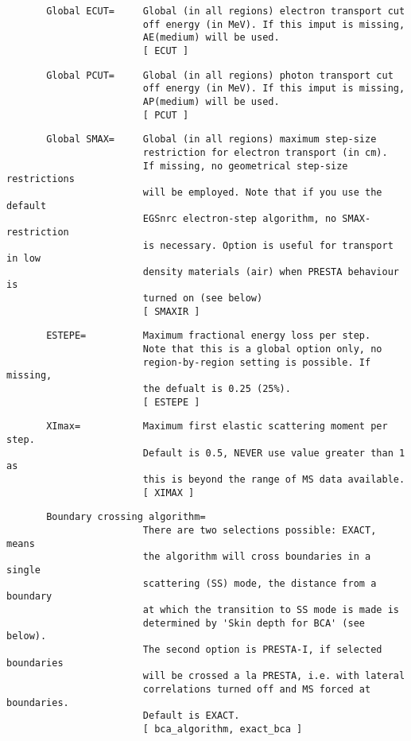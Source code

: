 \begin{verbatim}
       Global ECUT=     Global (in all regions) electron transport cut
                        off energy (in MeV). If this imput is missing,
                        AE(medium) will be used.
                        [ ECUT ]
\end{verbatim}
\begin{verbatim}
       Global PCUT=     Global (in all regions) photon transport cut
                        off energy (in MeV). If this imput is missing,
                        AP(medium) will be used.
                        [ PCUT ]
\end{verbatim}
\begin{verbatim}
       Global SMAX=     Global (in all regions) maximum step-size
                        restriction for electron transport (in cm).
                        If missing, no geometrical step-size restrictions
                        will be employed. Note that if you use the default
                        EGSnrc electron-step algorithm, no SMAX-restriction
                        is necessary. Option is useful for transport in low
                        density materials (air) when PRESTA behaviour is
                        turned on (see below)
                        [ SMAXIR ]
\end{verbatim}
\begin{verbatim}
       ESTEPE=          Maximum fractional energy loss per step.
                        Note that this is a global option only, no
                        region-by-region setting is possible. If missing,
                        the defualt is 0.25 (25%).
                        [ ESTEPE ]
\end{verbatim}
\begin{verbatim}
       XImax=           Maximum first elastic scattering moment per step.
                        Default is 0.5, NEVER use value greater than 1 as
                        this is beyond the range of MS data available.
                        [ XIMAX ]
\end{verbatim}
\begin{verbatim}
       Boundary crossing algorithm=
                        There are two selections possible: EXACT, means
                        the algorithm will cross boundaries in a single
                        scattering (SS) mode, the distance from a boundary
                        at which the transition to SS mode is made is
                        determined by 'Skin depth for BCA' (see below).
                        The second option is PRESTA-I, if selected boundaries
                        will be crossed a la PRESTA, i.e. with lateral
                        correlations turned off and MS forced at boundaries.
                        Default is EXACT.
                        [ bca_algorithm, exact_bca ]
\end{verbatim}
